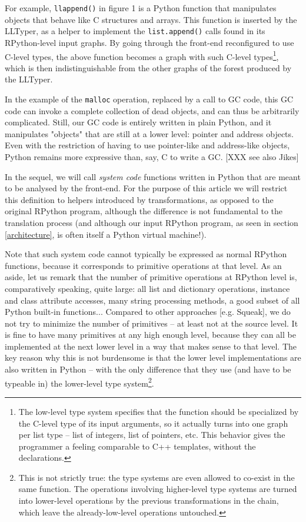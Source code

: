 \documentclass{acm_proc_article-sp}
\begin{document}
For example, \texttt{ll\textunderscore{}append()} in figure 1 is a Python function
that manipulates objects that behave like C structures and arrays.
This function is inserted by the LLTyper, as a helper to implement the
\texttt{list.append()} calls found in its RPython-level input graphs.
By going through the front-end reconfigured to use C-level types, the
above function becomes a graph with such C-level types\footnote{The
low-level type system specifies that the function should be
specialized by the C-level type of its input arguments, so it actually
turns into one graph per list type -- list of integers, list of
pointers, etc.  This behavior gives the programmer a feeling
comparable to C++ templates, without the declarations.}, which is then
indistinguishable from the other graphs of the forest produced by the
LLTyper.

In the example of the \texttt{malloc} operation, replaced by a call to GC
code, this GC code can invoke a complete collection of dead objects, and
can thus be arbitrarily complicated.  Still, our GC code is entirely
written in plain Python, and it manipulates "objects" that are still at
a lower level: pointer and address objects.  Even with the restriction
of having to use pointer-like and address-like objects, Python remains
more expressive than, say, C to write a GC.  [XXX see also Jikes]

In the sequel, we will call \textit{system code} functions written in
Python that are meant to be analysed by the front-end.  For the
purpose of this article we will restrict this definition to helpers
introduced by transformations, as opposed to the original RPython
program, although the difference is not fundamental to the translation
process (and although our input RPython program, as seen in section
\ref{architecture}, is often itself a Python virtual machine!).

Note that such system code cannot typically be expressed as normal
RPython functions, because it corresponds to primitive operations at
that level.  As an aside, let us remark that the number of primitive
operations at RPython level is, comparatively speaking, quite large:
all list and dictionary operations, instance and class attribute
accesses, many string processing methods, a good subset of all Python
built-in functions...  Compared to other approaches [e.g. Squeak], we
do not try to minimize the number of primitives -- at least not at the
source level.  It is fine to have many primitives at any high enough
level, because they can all be implemented at the next lower level in
a way that makes sense to that level.  The key reason why this is not
burdensome is that the lower level implementations are also written in
Python -- with the only difference that they use (and have to be
typeable in) the lower-level type system\footnote{This is not strictly
true: the type systems are even allowed to co-exist in the same
function.  The operations involving higher-level type systems are
turned into lower-level operations by the previous transformations in
the chain, which leave the already-low-level operations untouched.}.
\end{document}
